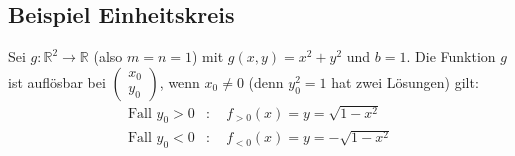 \documentclass[11pt,a4paper]{book}
\newcommand {\R}	{\mathbb{R}}
\newcommand {\Rzwei}	{\mathbb{R}^2}
\newcommand{\1}    	{\mathbbm{1}}
\begin{document}
\subsection{Beispiel Einheitskreis}
Sei \(g:\Rzwei \rightarrow \R\) (also \(m=n=1\)) mit \(g(x,y) = x^2 + y^2\) und \(b = 1\). Die Funktion \(g\) ist auflösbar bei \(\left( \begin{array}{c}
	x_0 \\ y_0
\end{array} \right)\), wenn \(x_0 \neq 0\) (denn \(y_0^2 = 1\) hat zwei Lösungen) gilt:
\begin{align*}
	\textrm{Fall } y_0 > 0 &: \quad f_{>0}(x) = y = \sqrt{1 - x^2} \\
	\textrm{Fall } y_0 < 0 &: \quad f_{<0}(x) = y = -\sqrt{1 - x^2}
\end{align*}
\end{document}
